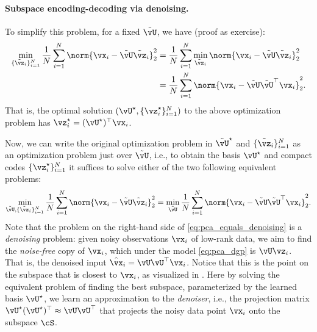 \documentclass[../../book-main.tex]{subfiles}
\begin{document}
\paragraph{Subspace encoding-decoding via denoising.}
To simplify this problem, for a fixed \(\tilde{\vU}\), we have (proof as exercise):
\begin{align}
    \min_{\{\tilde{\vz}_{i}\}_{i = 1}^{N}}\frac{1}{N}\sum_{i = 1}^{N}\norm{\vx_{i} - \tilde{\vU}\tilde{\vz}_{i}}_{2}^{2} 
    &= \frac{1}{N}\sum_{i = 1}^{N}\min_{\tilde{\vz}_{i}}\norm{\vx_{i} - \tilde{\vU}\tilde{\vz}_{i}}_{2}^{2} \\
    &= \frac{1}{N}\sum_{i = 1}^{N}\norm{\vx_{i} - \tilde{\vU}\tilde{\vU}^{\top}\vx_{i}}_{2}^{2}. 
\end{align}
That is, the optimal solution \((\vU^{\star}, \{\vz_{i}^{\star}\}_{i = 1}^{N})\)
to the above optimization problem has $\vz_i^{\star} = (\vU^{\star})^\top\vx_i$.

Now, we can write the original optimization problem in \(\tilde{\vU}^{\star}\) 
and \(\{\tilde{\vz}_{i}\}_{i = 1}^{N}\) as an optimization problem just over
\(\tilde{\vU}\), i.e., to obtain the basis \(\vU^{\star}\) and compact codes
\(\{\vz_{i}^{\star}\}_{i = 1}^{N}\) it suffices to solve either of the two following equivalent problems:
\begin{equation}\label{eq:pca_equals_denoising}
    \min_{\tilde{\vU}, \{\tilde{\vz}_{i}\}_{i = 1}^{N}}\frac{1}{N}\sum_{i = 1}^{N}\norm{\vx_{i} - \tilde{\vU}\tilde{\vz}_{i}}_{2}^{2} = \min_{\tilde{\vU}}\frac{1}{N}\sum_{i = 1}^{N}\norm{\vx_{i} - \tilde{\vU}\tilde{\vU}^{\top}\vx_{i}}_{2}^{2}.
\end{equation}
Note that the problem on the right-hand side of \eqref{eq:pca_equals_denoising}
is a \textit{denoising} problem: given noisy observations \(\vx_{i}\) of
low-rank data, we aim to find the \textit{noise-free} copy of \(\vx_{i}\), which
under the model \eqref{eq:pca_dgp} is $\vU\vz_{i}$. That is, the denoised input
$\hat{\vx}_i = \vU\vU^\top \vx_i$. Notice that this is the point on the subspace
that is closest to $\vx_i$, as visualized in . Here by
solving the equivalent problem of finding the best subspace, parameterized by
the learned basis \(\vU^{\star}\), we learn an approximation to the
\textit{denoiser}, i.e., the projection matrix \(\vU^{\star}(\vU^{\star})^{\top} \approx \vU\vU^{\top}\) that projects the noisy data point $\vx_i$ onto the subspace \(\cS\). %
\end{document}
